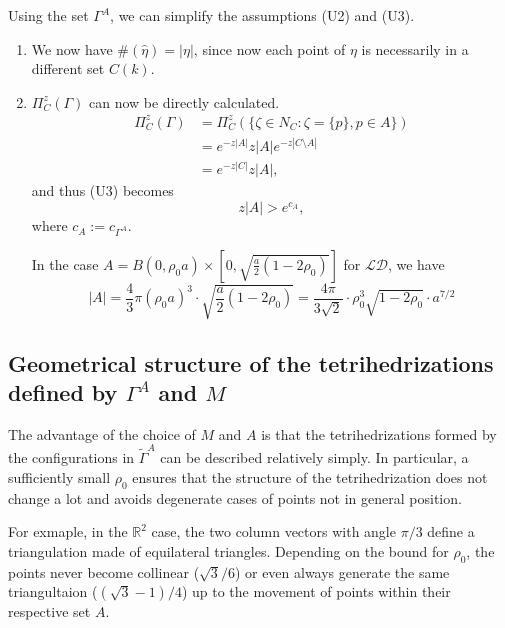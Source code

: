 \begin{remark}\label{r:UA}
	Using the set $\Gamma^A$, we can simplify the assumptions (U2) and (U3).
\begin{enumerate}[(U2)]	
\item	We now have  $\#(\hat\eta) = |\eta|$, since now each point of $\eta$ is necessarily in a different set $C(k)$.

\item $\Pi^z_C(\Gamma)$ can now be directly calculated.
	\begin{align*} 
		\Pi^z_C(\Gamma) &= \Pi^z_C(\{\zeta \in N_C: \zeta = \{p\}, p \in A\}) \\
		& = e^{-z|A|} z |A| e^{-z|C\setminus A|} \\
		& = e^{-z|C|} z |A|,
	\end{align*}
	and thus (U3) becomes
	$$z|A| > e^{c_{A}},$$
	where $c_A := c_{\Gamma^A}$.

	In  the case $A = B(0,\rho_0 a)\times [0, \sqrt{\frac a2(1-2\rho_0)}]$ for $\mathcal {LD}$, we have
	$$|A| = \frac 43 \pi (\rho_0 a)^3 \cdot \sqrt{\frac a2(1-2\rho_0)} = \frac {4\pi}{3\sqrt{2}}\cdot  \rho_0^3 \sqrt{1-2\rho_0} \cdot a^{7/2}$$

\end{enumerate}
\end{remark}


\subsection{Geometrical structure of the tetrihedrizations defined by $\Gamma^A$ and $M$}
The advantage of the choice of $M$ and $A$ is that the tetrihedrizations formed by the configurations in $\tilde\Gamma^A$ can be described relatively simply. In particular, a sufficiently small $\rho_0$ ensures that the structure of the tetrihedrization does not change a lot and avoids degenerate cases of points not in general position. 

For exmaple, in the $\mathbb R^2$ case, the two column vectors with angle $\pi/3$ define a triangulation made of equilateral triangles. Depending on the bound for $\rho_0$, the points never become collinear ($\sqrt 3/6$) or even always generate the same triangultaion ($(\sqrt 3 - 1)/4$) up to the movement of points within their respective set $A$. \newline

